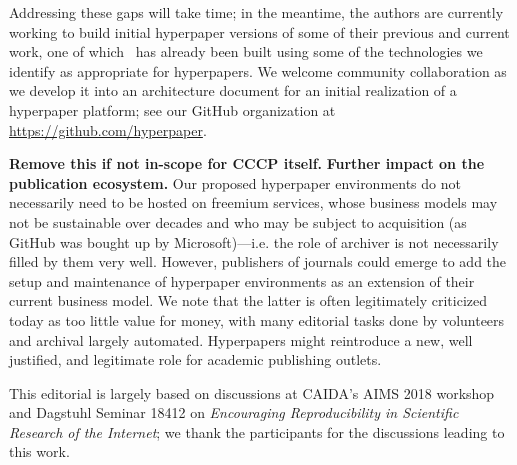 \documentclass[sigconf]{acmart}
\begin{document}
Addressing these gaps will take time; in the meantime, the authors are currently
working to build initial hyperpaper versions of some of their previous and
current work, one of which~\cite{Trammell17} has already been built using some
of the technologies we identify as appropriate for hyperpapers. We welcome
community collaboration as we develop it into an architecture document for an
initial realization of a hyperpaper platform; see our GitHub organization at
\url{https://github.com/hyperpaper}.

\textbf{Remove this if not in-scope for CCCP itself.} \textbf{Further impact on
the publication ecosystem.} Our proposed hyperpaper environments do not
necessarily need to be hosted on freemium services, whose business models may
not be sustainable over decades and who may be subject to acquisition (as
GitHub was bought up by Microsoft)---i.e. the role of archiver is not
necessarily filled by them very well. However, publishers of journals could
emerge to add the setup and maintenance of hyperpaper environments as an
extension of their current business model. We note that the latter is often
legitimately criticized today as too little value for money, with many
editorial tasks done by volunteers and archival largely automated. Hyperpapers
might reintroduce a new, well justified, and legitimate role for academic
publishing outlets.


\begin{acks}
This editorial is largely based on discussions at CAIDA's AIMS 2018 workshop and
Dagstuhl Seminar 18412 on \emph{Encouraging Reproducibility in Scientific
Research of the Internet}; we thank the participants for the discussions leading
to this work.
\end{acks}

	
	
\end{document}
